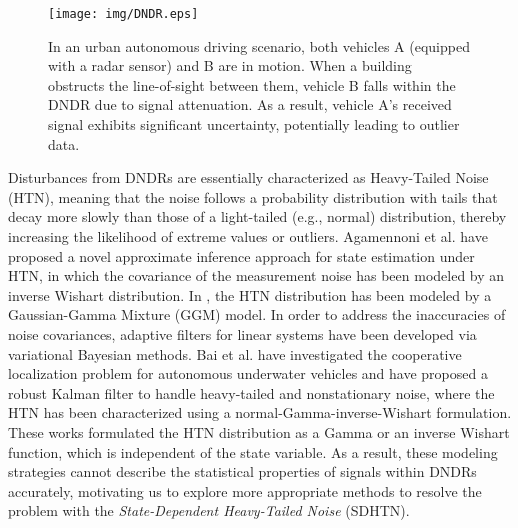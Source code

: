 \documentclass[10pt,twocolumn,twoside]{IEEEtran}
\begin{document}
\begin{figure}[htbp]
    \centering
    \texttt{[image: img/DNDR.eps]}
    \caption{In an urban autonomous driving scenario, both vehicles A (equipped with a radar sensor) and B are in motion. When a building obstructs the line-of-sight between them, vehicle B falls within the DNDR due to signal attenuation. As a result, vehicle A's received signal exhibits significant uncertainty, potentially leading to outlier data.}
    \label{fig:DNDR}
\end{figure}

Disturbances from DNDRs are essentially characterized as Heavy-Tailed Noise (HTN), meaning that the noise follows a probability distribution with tails that decay more slowly than those of a light-tailed (e.g., normal) distribution, thereby increasing the likelihood of extreme values or outliers. Agamennoni et al. \cite{agamennoni2012approximate} have proposed a novel approximate inference approach for state estimation under HTN, in which the covariance of the measurement noise has been modeled by an inverse Wishart distribution. In \cite{zhu2021novel,zhu2021adaptive}, the HTN distribution has been modeled by a Gaussian-Gamma Mixture (GGM) model. In order to address the inaccuracies of noise covariances, adaptive filters for linear systems have been developed via variational Bayesian methods. Bai et al. \cite{bai2021novel} have investigated the cooperative localization problem for autonomous underwater vehicles and have proposed a robust Kalman filter to handle heavy-tailed and nonstationary noise, where the HTN has been characterized using a normal-Gamma-inverse-Wishart formulation. These works formulated the HTN distribution as a Gamma or an inverse Wishart function, which is independent of the state variable. As a result, these modeling strategies cannot describe the statistical properties of signals within DNDRs accurately, motivating us to explore more appropriate methods to resolve the problem with the {\it State-Dependent Heavy-Tailed Noise} (SDHTN).
\end{document}
